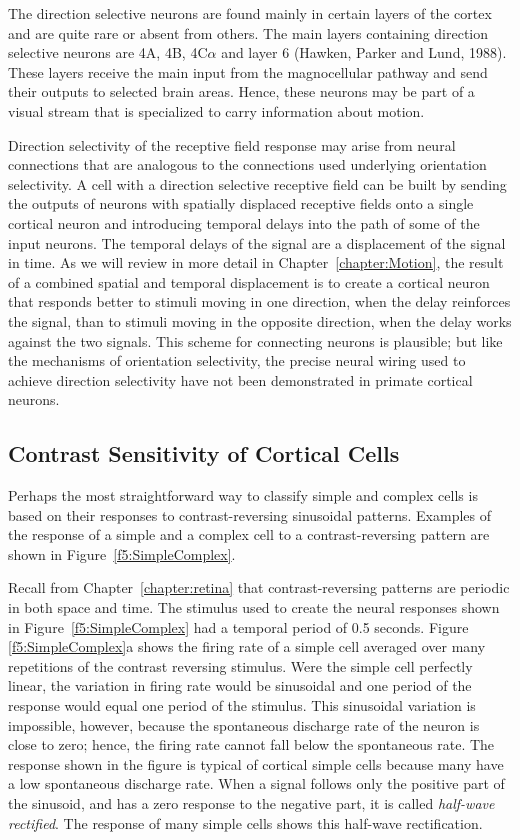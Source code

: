 The direction selective neurons are found mainly
in certain layers of the cortex and are quite rare or absent
from others.
The main layers containing direction selective
neurons are 4A, 4B, 4C$\alpha$ and layer 6 (Hawken, Parker and Lund, 1988).
These layers receive the main input from the magnocellular pathway
and send their outputs to selected brain areas.
Hence, these neurons may be part of a visual stream that is
specialized to carry information about motion.

Direction selectivity of the receptive field response
may arise from neural connections that are analogous to the
connections used underlying orientation selectivity.
A cell with a direction selective receptive field
can be built by sending the outputs of
neurons with spatially displaced receptive fields
onto a single cortical neuron
and introducing temporal delays into the path
of some of the input neurons.
The temporal delays of the signal are 
a displacement of the signal in time.
As we will review
in more detail in Chapter~\ref{chapter:Motion},
the result of a combined spatial and temporal 
displacement is to create a cortical neuron that responds
better to stimuli moving in one direction, when the delay reinforces
the signal, than to stimuli moving in the
opposite direction, when the delay works against the two signals.
This scheme for connecting neurons
is plausible; but like the mechanisms of orientation selectivity,
the precise neural wiring used to achieve direction selectivity
have not been demonstrated in primate cortical neurons.

\subsection*{Contrast Sensitivity of Cortical Cells}
Perhaps the most straightforward way to classify simple
and complex cells is based on their responses to
contrast-reversing sinusoidal patterns.
Examples of the response of a simple and a complex cell
to a contrast-reversing pattern are shown
in Figure~\ref{f5:SimpleComplex}.

Recall from Chapter~\ref{chapter:retina}
that contrast-reversing patterns are periodic in both space and time.
The stimulus used to create the neural responses shown
in Figure~\ref{f5:SimpleComplex} had a temporal period of 0.5 seconds.
Figure \ref{f5:SimpleComplex}a
shows the firing rate of a simple cell
averaged over many repetitions of the contrast reversing stimulus.
Were the simple cell perfectly linear, 
the variation in firing rate would be sinusoidal
and one period of the response would equal one period
of the stimulus.
This sinusoidal variation is impossible, 
however, because the spontaneous discharge rate of the neuron is close
to zero;
hence, the firing rate cannot fall below the spontaneous rate.
The response shown in the figure is typical of cortical simple cells
because many have a low spontaneous discharge rate.
When a signal follows only the positive part of the
sinusoid, and has a zero response to the negative part,
it is called {\em half-wave rectified}.
The response of many simple cells 
shows this half-wave rectification.

